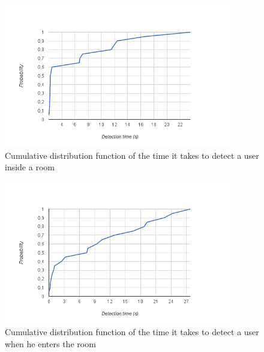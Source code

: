 \begin{figure}[]
\centering
\includegraphics[width=0.9\textwidth]{Figures/room_detection_cumulative}
\caption{Cumulative distribution function of the time it takes to detect a user inside a room}
\label{eval:room}
\end{figure}

\begin{figure}[]
\centering
\includegraphics[width=0.9\textwidth]{Figures/room_detection_cumulative2}
\caption{Cumulative distribution function of the time it takes to detect a user when he enters the room}
\label{eval:room2}
\end{figure}

